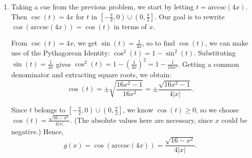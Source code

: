 \documentclass{ximera}
\begin{document}
\begin{example}
\begin{explanation}
\begin{enumerate}
\begin{enumerate}
\[ \tan(t) = \left\{ \begin{array}{rr} \sqrt{x^2-1}, & \text{if $0 \leq t < \frac{\pi}{2}$} \\   -\sqrt{x^2-1}, & \text{if $\frac{\pi}{2} < t \leq \pi$}  \end{array}\right. \]

Now we need to determine what these conditions on $t$ mean for $x$.  Since $x = \sec(t)$, when $0 \leq t < \frac{\pi}{2}$, $x \geq 1$, and when $\frac{\pi}{2} < t \leq \pi$, $x \leq -1$. Hence,

\[f(x) =  \tan(\text{arcsec}(x)) = \left\{ \begin{array}{rr} \sqrt{x^2-1}, & \text{if $x \geq 1$} \\   -\sqrt{x^2-1}, & \text{if $x \leq -1$}  \end{array}\right. \]

To find the domain of $f$, we consider $f(x) =  \tan(\text{arcsec}(x))$ as a two step process.  First, we have the arcsecant function, whose domain is $(-\infty, -1] \cup [1, \infty)$. 

 

Since the range of $\text{arcsec}(x)$ is $\left[0, \frac{\pi}{2}\right) \cup \left(\frac{\pi}{2}, \pi \right]$, taking the tangent of any output from $\text{arcsec}(x)$  is defined.  Hence, the domain of $f$ is $(-\infty, -1] \cup [1, \infty)$.



\item  Taking a cue from the previous problem, we start by letting $t = \text{arccsc}(4x)$.   Then $\csc(t) = 4x$ for $t$ in $\left[-\frac{\pi}{2}, 0 \right) \cup \left(0, \frac{\pi}{2}\right]$.  Our goal is to rewrite  $\cos(\text{arccsc}(4x)) = \cos(t)$ in terms of $x$.

 

From $\csc(t) = 4x$, we get $\sin(t) = \frac{1}{4x}$, so to find $\cos(t)$, we can make use of the Pythagorean Identity:  $\cos^{2}(t)= 1- \sin^{2}(t)$.  Substituting $\sin(t) = \frac{1}{4x}$  gives $\cos^{2}(t) = 1 - \left(\frac{1}{4x}\right)^2 = 1 - \frac{1}{16x^2}$.  Getting a common denominator and extracting square roots, we obtain: \[\cos(t) = \pm \sqrt{\frac{16x^2-1}{16x^2}} = \pm \frac{\sqrt{16x^2-1}}{4|x|}.\]



Since $t$ belongs to $\left[-\frac{\pi}{2}, 0 \right) \cup \left(0, \frac{\pi}{2}\right]$, we know $\cos(t) \geq 0$, so we choose $\cos(t) = \frac{\sqrt{16-x^2}}{4|x|}$. (The absolute values here are necessary, since $x$ could be negative.)  Hence, \[g(x) = \cos(\text{arccsc}(4x)) = \frac{\sqrt{16-x^2}}{4|x|}.\]


\end{enumerate}
\end{enumerate}
\end{explanation}
\end{example}
\end{document}
